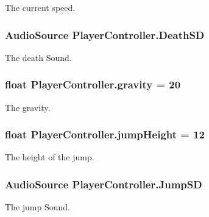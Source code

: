 The current speed. 

\hypertarget{classPlayerController_ac991ebede5b7666a4dcfefbd73114393}{
\subsubsection[{Death\-S\-D}]{\setlength{\rightskip}{0pt plus 5cm}Audio\-Source Player\-Controller.\-Death\-S\-D}}\label{classPlayerController_ac991ebede5b7666a4dcfefbd73114393}


The death Sound. 

\hypertarget{classPlayerController_a0a8e0eb9de4ccc5bd5f4cc5b44469b01}{
\subsubsection[{gravity}]{\setlength{\rightskip}{0pt plus 5cm}float Player\-Controller.\-gravity = 20}}\label{classPlayerController_a0a8e0eb9de4ccc5bd5f4cc5b44469b01}


The gravity. 

\hypertarget{classPlayerController_a1f5dfe5afd998f509dbb405800619b6d}{
\subsubsection[{jump\-Height}]{\setlength{\rightskip}{0pt plus 5cm}float Player\-Controller.\-jump\-Height = 12}}\label{classPlayerController_a1f5dfe5afd998f509dbb405800619b6d}


The height of the jump. 

\hypertarget{classPlayerController_a3f516eecb6942aa1ec667de83154d350}{
\subsubsection[{Jump\-S\-D}]{\setlength{\rightskip}{0pt plus 5cm}Audio\-Source Player\-Controller.\-Jump\-S\-D}}\label{classPlayerController_a3f516eecb6942aa1ec667de83154d350}


The jump Sound. 

